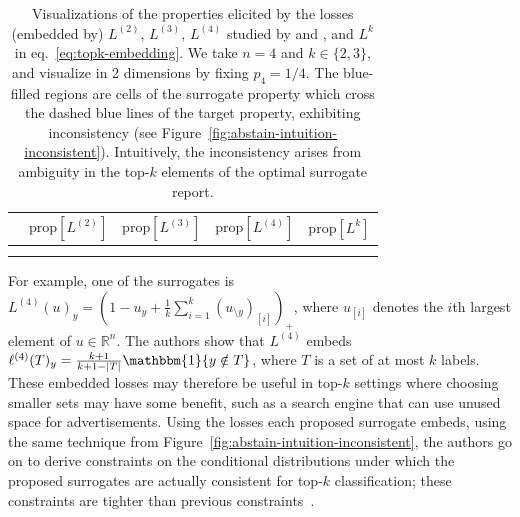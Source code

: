 \documentclass[twoside,11pt]{article}
\newcommand{\reals}{\mathbb{R}}
\newcommand{\prop}[1]{\mathrm{prop}[#1]}
\newcommand{\Li}[1]{L^{(#1)}}
\newcommand{\elli}[1]{\ell^{(#1)}}
\newcommand{\ones}{\mathbbm{1}}
\begin{document}
\begin{table}
	\centering
	\begin{tabular}{ccccc}
		& $\prop{\Li{2}}$ & $\prop{\Li{3}}$ & $\prop{\Li{4}}$ & $\prop{L^k}$\\
		\hline \hline
		\rotatebox[origin=c]{90}{$k = 2$\hspace*{-2.5cm}} &  &  &  & \\ 
		\rotatebox[origin=c]{90}{$k = 3$\hspace*{-2.5cm}} &  &  &  & \\ 
	\end{tabular}
	\caption{
		Visualizations of the properties elicited by the losses (embedded by) $\Li{2}$, $\Li{3}$, $\Li{4}$ studied by \citet{yang2018consistency} and \citet{finocchiaro2022consistenttopk}, and $L^k$ in eq.~\eqref{eq:topk-embedding}.
    We take $n=4$ and $k \in \{2,3\}$, and visualize in 2 dimensions by fixing $p_4 = 1/4$. 
		The blue-filled regions are cells of the surrogate property which cross the dashed blue lines of the target property, exhibiting inconsistency (see Figure~\ref{fig:abstain-intuition-inconsistent}).
    Intuitively, the inconsistency arises from ambiguity in the top-$k$ elements of the optimal surrogate report.  
	}
	\label{tab:loss-slices}
\end{table}

For example, one of the surrogates is $\Li {4}(u)_y = \left(1 - u_y + \frac 1 k \sum_{i=1}^k (u_{\setminus y})_{[i]}\right)_+$, where $u_{[i]}$ denotes the $i$th largest element of $u \in \reals^n$.
The authors show that $\Li{4}$ embeds $\ell^{(4)}(T)_y = \tfrac {k+1} {k+1-|T|} \ones\{y\notin T\}$, where $T$ is a set of at most $k$ labels.
These embedded losses may therefore be useful in top-$k$ settings where choosing smaller sets may have some benefit, such as a search engine that can use unused space for advertisements.
Using the losses each proposed surrogate embeds, using the same technique from Figure~\ref{fig:abstain-intuition-inconsistent}, the authors go on to derive constraints on the conditional distributions under which the proposed surrogates are actually consistent for top-$k$ classification; these constraints are tighter than previous constraints~\citep{yang2018consistency}.
\end{document}
